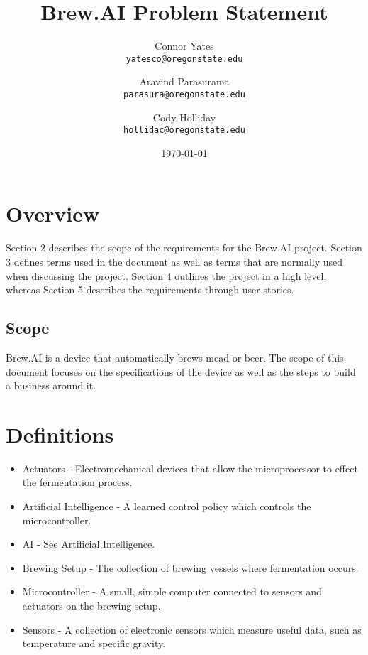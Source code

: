 \documentclass[draftclsnofoot,onecolumn,letterpaper,10pt]{IEEEtran}
\author{Connor Yates\\
\texttt{yatesco@oregonstate.edu\\}
\and
Aravind Parasurama\\
\texttt{parasura@oregonstate.edu\\}
\and
Cody Holliday\\
\texttt{hollidac@oregonstate.edu\\}}
\date{\today}
\title{Brew.AI Problem Statement}
\begin{document}
\maketitle

\newpage

\section{Overview}
Section 2 describes the scope of the requirements for the Brew.AI project.
Section 3 defines terms used in the document as well as terms that are normally used when discussing the project.
Section 4 outlines the project in a high level, whereas Section 5 describes the requirements through user stories.

\subsection{Scope}
Brew.AI is a device that automatically brews mead or beer.
The scope of this document focuses on the specifications of the device as well as the steps to build a business around it.


\section{Definitions}
\begin{itemize}
	\item Actuators - Electromechanical devices that allow the microprocessor to effect the fermentation process.
	\item Artificial Intelligence - A learned control policy which controls the microcontroller.
	\item AI - See Artificial Intelligence.
	\item Brewing Setup - The collection of brewing vessels where fermentation occurs.
	\item Microcontroller - A small, simple computer connected to sensors and actuators on the brewing setup.
	\item Sensors - A collection of electronic sensors which measure useful data, such as temperature and specific gravity.
\end{itemize}
\end{document}
